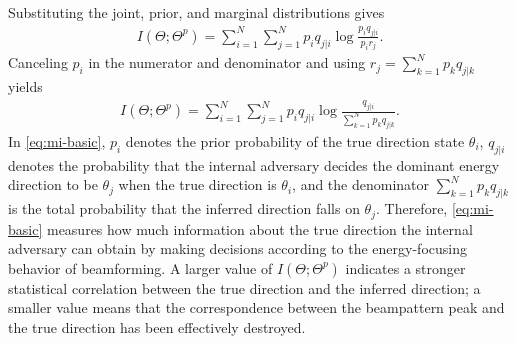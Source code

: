 \documentclass[conference,twocolumn,a4paper]{IEEEtran}
\begin{document}
Substituting the joint, prior, and marginal distributions gives
\begin{equation}
\begin{aligned}
I(\Theta;\Theta^p)
=\sum_{i=1}^{N}\sum_{j=1}^{N}p_i q_{j|i}
\log\frac{p_i q_{j|i}}{p_i r_j}.
\end{aligned}
\end{equation}
Canceling $p_i$ in the numerator and denominator and using $r_j=\sum_{k=1}^{N}p_k q_{j|k}$ yields
\begin{equation}
\begin{aligned}
I(\Theta;\Theta^p)
=\sum_{i=1}^{N}\sum_{j=1}^{N} p_i q_{j|i}
\log\frac{q_{j|i}}{\sum_{k=1}^{N}p_k q_{j|k}}.
\end{aligned}
\label{eq:mi-basic}
\end{equation}
In \eqref{eq:mi-basic}, $p_i$ denotes the prior probability of the true direction state $\theta_i$, $q_{j|i}$ denotes the probability that the internal adversary decides the dominant energy direction to be $\theta_j$ when the true direction is $\theta_i$, and the denominator $\sum_{k=1}^{N}p_k q_{j|k}$ is the total probability that the inferred direction falls on $\theta_j$. Therefore, \eqref{eq:mi-basic} measures how much information about the true direction the internal adversary can obtain by making decisions according to the energy-focusing behavior of beamforming. A larger value of $I(\Theta;\Theta^p)$ indicates a stronger statistical correlation between the true direction and the inferred direction; a smaller value means that the correspondence between the beampattern peak and the true direction has been effectively destroyed.
\end{document}
